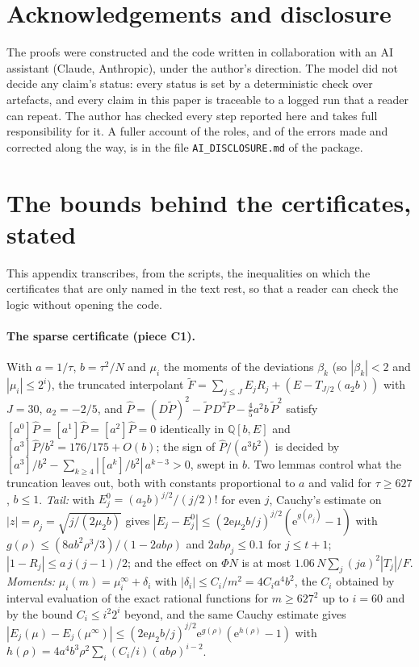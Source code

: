 \documentclass[12pt]{article}
\newcommand{\Qq}{\mathbb{Q}}
\newcommand{\ee}{\mathrm{e}}
\begin{document}
\section*{Acknowledgements and disclosure}

The proofs were constructed and the code written in collaboration with an AI assistant (Claude, Anthropic), under the author's direction. The model did not decide any claim's status: every status is set by a deterministic check over artefacts, and every claim in this paper is traceable to a logged run that a reader can repeat. The author has checked every step reported here and takes full responsibility for it. A fuller account of the roles, and of the errors made and corrected along the way, is in the file \texttt{AI\_DISCLOSURE.md} of the package.


\appendix
\section{The bounds behind the certificates, stated}\label{app:bounds}

This appendix transcribes, from the scripts, the inequalities on which the certificates that are only named in the text rest, so that a reader can check the logic without opening the code.

\paragraph{The sparse certificate (piece C1).}
With $a = 1/\tau$, $b = \tau^2/N$ and $\mu_i$ the moments of the deviations $\beta_k$ (so $|\beta_k|<2$ and $|\mu_i|\le 2^i$), the truncated interpolant $\tilde F = \sum_{j\le J}E_jR_j + (E - T_{J/2}(a_2 b))$ with $J = 30$, $a_2 = -2/5$, and $\hat P = (D\tilde P)^2 - \tilde P\,D^2\tilde P - \frac45 a^2 b\,\tilde P^2$ satisfy $[a^0]\hat P = [a^1]\hat P = [a^2]\hat P = 0$ identically in $\Qq[b,E]$ and $[a^3]\hat P/b^2 = 176/175 + O(b)$; the sign of $\hat P/(a^3b^2)$ is decided by $[a^3]/b^2 - \sum_{k\ge4}|[a^k]/b^2|\,a^{k-3} > 0$, swept in $b$. Two lemmas control what the truncation leaves out, both with constants proportional to $a$ and valid for $\tau\ge627$, $b\le1$. \emph{Tail:} with $E_j^0 = (a_2b)^{j/2}/(j/2)!$ for even $j$, Cauchy's estimate on $|z| = \rho_j = \sqrt{j/(2\mu_2 b)}$ gives $|E_j - E_j^0| \le (2\ee\mu_2 b/j)^{j/2}(\ee^{g(\rho_j)}-1)$ with $g(\rho) \le (8ab^2\rho^3/3)/(1-2ab\rho)$ and $2ab\rho_j \le 0.1$ for $j\le t+1$; $|1-R_j| \le a\,j(j-1)/2$; and the effect on $\Phi N$ is at most $1.06\,N\sum_j (ja)^2|T_j|/F$. \emph{Moments:} $\mu_i(m) = \mu_i^\infty + \delta_i$ with $|\delta_i| \le C_i/m^2 = 4C_ia^4b^2$, the $C_i$ obtained by interval evaluation of the exact rational functions for $m\ge 627^2$ up to $i = 60$ and by the bound $C_i \le i^2 2^i$ beyond, and the same Cauchy estimate gives $|E_j(\mu)-E_j(\mu^\infty)| \le (2\ee\mu_2b/j)^{j/2}\ee^{g(\rho)}(\ee^{h(\rho)}-1)$ with $h(\rho) = 4a^4b^3\rho^2\sum_i (C_i/i)(ab\rho)^{i-2}$.
\end{document}
